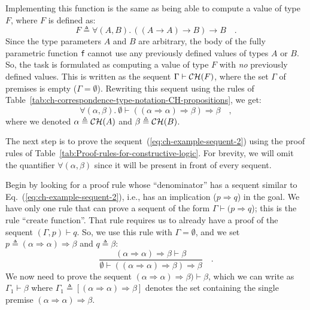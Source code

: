 \noindent Implementing this function is the same as being able to
compute a value of type $F$, where $F$ is defined as:
\[
F\triangleq\forall(A,B).\,((A\rightarrow A)\rightarrow B)\rightarrow B\quad.
\]
Since the type parameters $A$ and $B$ are arbitrary, the body of
the fully parametric function \lstinline!f! cannot use any previously
defined values of types $A$ or $B$. So, the task is formulated as
computing a value of type $F$ with \emph{no} previously defined values.
This is written as the sequent $\Gamma\vdash{\cal CH}(F)$, where
the set $\Gamma$ of premises is empty ($\Gamma=\emptyset$). Rewriting
this sequent using the rules of Table~\ref{tab:ch-correspondence-type-notation-CH-propositions},
we get:
\begin{equation}
\forall(\alpha,\beta).~\emptyset\vdash((\alpha\Rightarrow\alpha)\Rightarrow\beta)\Rightarrow\beta\quad,\label{eq:ch-example-sequent-2}
\end{equation}
where we denoted $\alpha\triangleq{\cal CH}(A)$ and $\beta\triangleq{\cal CH}(B)$. 

The next step is to prove the sequent~(\ref{eq:ch-example-sequent-2})
using the proof rules of Table~\ref{tab:Proof-rules-for-constructive-logic}.
For brevity, we will omit the quantifier $\forall(\alpha,\beta)$
since it will be present in front of every sequent.

Begin by looking for a proof rule whose \textsf{``}denominator\textsf{''} has a sequent
similar to Eq.~(\ref{eq:ch-example-sequent-2}), i.e., has an implication
($p\Rightarrow q$) in the goal. We have only one rule that can prove
a sequent of the form $\Gamma\vdash(p\Rightarrow q$); this is the
rule \textsf{``}$\text{create function}$\textsf{''}. That rule requires us to already
have a proof of the sequent $(\Gamma,p)\vdash q$. So, we use this
rule with $\Gamma=\emptyset$, and we set $p\triangleq(\alpha\Rightarrow\alpha)\Rightarrow\beta$
and $q\triangleq\beta$: 
\[
\frac{(\alpha\Rightarrow\alpha)\Rightarrow\beta\vdash\beta}{\emptyset\vdash((\alpha\Rightarrow\alpha)\Rightarrow\beta)\Rightarrow\beta}\quad.
\]
We now need to prove the sequent $(\alpha\Rightarrow\alpha)\Rightarrow\beta)\vdash\beta$,
which we can write as $\Gamma_{1}\vdash\beta$ where $\Gamma_{1}\triangleq[(\alpha\Rightarrow\alpha)\Rightarrow\beta]$
denotes the set containing the single premise $(\alpha\Rightarrow\alpha)\Rightarrow\beta$. 

